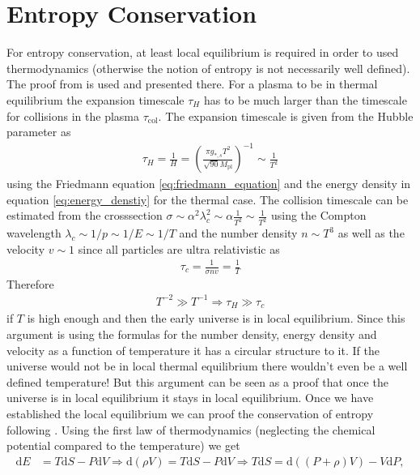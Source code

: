 \documentclass[twoside,a4paper, 12pt]{article}
\newcommand{\diff}{\mathrm{d}}
\numberwithin{equation}{section}
\begin{document}
\section{Entropy Conservation}
\label{sec:entropy_conversation}
For entropy conservation, at least local equilibrium is required in order to used thermodynamics
(otherwise the notion of entropy is not necessarily well defined).
The proof from \cite[Sec. 3.3, Page. 74]{CosmologyBookMukhanov} is used and presented there.
For a plasma to be in thermal equilibrium the expansion timescale $\tau_H$ has
to be much larger than the timescale for collisions in the plasma $\tau_\mathrm{col}$.
The expansion timescale is given from the Hubble parameter as
\begin{align*}
    \tau_H = \frac{1}{H} = \left( \frac{\pi g_{*,s} T^2}{\sqrt{90} M_\mathrm{pl}} \right)^{-1}
    \sim \frac{1}{T^2}
\end{align*}
using the Friedmann equation \eqref{eq:friedmann_equation} and the
energy density in equation \eqref{eq:energy_denstiy} for the thermal case.
The collision timescale can be estimated from the crosssection
$\sigma \sim \alpha^2 \lambda_c^2 \sim \alpha \frac{1}{T^2} \sim \frac{1}{T^2}$
using the Compton wavelength $\lambda_c \sim 1 / p \sim 1 / E \sim 1 / T$
and the number density $n \sim T^3$ as well as the velocity
$v \sim 1$ since all particles are ultra relativistic as
\begin{align*}
    \tau_c = \frac{1}{\sigma n v} = \frac{1}{T}
\end{align*}
Therefore
\begin{align*}
    T^{-2} \gg T^{-1} \Rightarrow \tau_H \gg \tau_c
\end{align*}
if $T$ is high enough and then the early universe is in
local equilibrium.
Since this argument is using the formulas for
the number density, energy density and velocity
as a function of temperature it has a circular structure to it. If the universe would not be
in local thermal equilibrium
there wouldn't even be a well defined  temperature!
But this argument can be seen as a proof
that once the universe is in local equilibrium
it stays in local equilibrium.
Once we have established the local equilibrium
we can proof the conservation of
entropy following \cite[Sec. 3.4, from page 65]{TheEarlyUniverseKolbAndTurner}.
Using the first law of thermodynamics (neglecting the chemical potential compared to the temperature) we get
\begin{align}
    \label{eq:first_law}
    \diff E &= T \diff S - P \diff V
    \Rightarrow \diff (\rho V) = T \diff S - P \diff V
    \Rightarrow T \diff S%
    = \diff ((P + \rho) V) - V \diff P,
\end{align}
\end{document}
